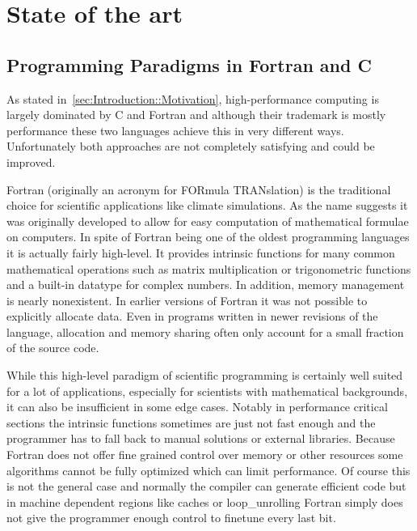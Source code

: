 \chapter{State of the art}
\label{ch:State_of_the_art}


\section{Programming Paradigms in Fortran and C}
\label{sec:State_of_the_art::Paradigms}

As stated in~\autoref{sec:Introduction::Motivation}, high-performance computing is largely dominated by C and Fortran and although their trademark is mostly performance these two languages achieve this in very different ways. Unfortunately both approaches are not completely satisfying and could be improved.

Fortran (originally an acronym for FORmula TRANslation) is the traditional choice for scientific applications like climate simulations. As the name suggests it was originally developed to allow for easy computation of mathematical formulae on computers. In spite of Fortran being one of the oldest programming languages it is actually fairly high-level. It provides \gls{intrinsic} functions for many common mathematical operations such as matrix multiplication or trigonometric functions and a built-in datatype for complex numbers. In addition, memory management is nearly nonexistent. In earlier versions of Fortran it was not possible to explicitly allocate data. Even in programs written in newer revisions of the language, allocation and memory sharing often only account for a small fraction of the source code.

While this high-level paradigm of scientific programming is certainly well suited for a lot of applications, especially for scientists with mathematical backgrounds, it can also be insufficient in some edge cases. Notably in performance critical sections the \gls{intrinsic} functions sometimes are just not fast enough and the programmer has to fall back to manual solutions or external libraries. Because Fortran does not offer fine grained control over memory or other resources some algorithms cannot be fully optimized which can limit performance. Of course this is not the general case and normally the compiler can generate efficient code but in machine dependent regions like caches or \gls{loop_unrolling} Fortran simply does not give the programmer enough control to finetune every last bit.

